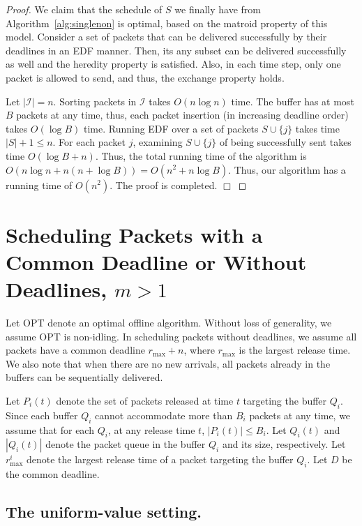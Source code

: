 \documentclass[final, 11pt]{article}
\begin{document}
\begin{proof}
We claim that the schedule of $S$ we finally have from Algorithm~\ref{alg:singlenon} is optimal, based on the matroid property of this model. Consider a set of packets that can be delivered successfully by their deadlines in an EDF manner. Then, its any subset can be delivered successfully as well and the heredity property is satisfied. Also, in each time step, only one packet is allowed to send, and thus, the exchange property holds.

Let $|{\mathcal I}| = n$. Sorting packets in $\mathcal I$ takes $O(n \log n)$ time. The buffer has at most $B$ packets at any time, thus, each packet insertion (in increasing deadline order) takes $O(\log B)$ time. Running EDF over a set of packets $S \cup \{j\}$ takes time $|S| + 1 \le n$. For each packet $j$, examining $S \cup \{j\}$ of being successfully sent takes time $O(\log B + n)$. Thus, the total running time of the algorithm is $O(n \log n + n (n + \log B)) = O(n^2 + n \log B)$. Thus, our algorithm has a running time of $O(n^2)$. The proof is completed. $\Box$
\end{proof}


\section{Scheduling Packets with a Common Deadline or Without Deadlines, $m > 1$}

Let OPT denote an optimal offline algorithm. Without loss of generality, we assume OPT is non-idling. In scheduling packets without deadlines, we assume all packets have a common deadline $r_{\max} + n$, where $r_{\max}$ is the largest release time. We also note that when there are no new arrivals, all packets already in the buffers can be sequentially delivered.

Let $P_i(t)$ denote the set of packets released at time $t$ targeting the buffer $Q_i$. Since each buffer $Q_i$ cannot accommodate more than $B_i$ packets at any time, we assume that for each $Q_i$, at any release time $t$, $|P_i(t)| \le B_i$. Let $Q_i(t)$ and $|Q_i(t)|$ denote the packet queue in the buffer $Q_i$ and its size, respectively.  Let $r^i_{\max}$ denote the largest release time of a packet targeting the buffer $Q_i$. Let $D$ be the common deadline.


\subsection{The uniform-value setting.}
\end{document}
